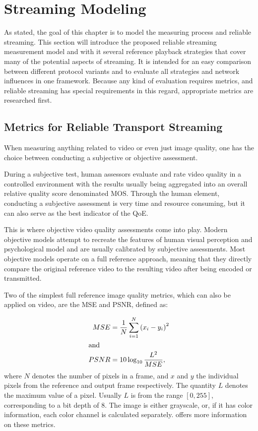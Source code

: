 \section{Streaming Modeling}
\label{c3:sec:modeling}

As stated, the goal of this chapter is to model the measuring process and reliable streaming. This section will introduce the proposed reliable streaming measurement model and with it several reference playback strategies that cover many of the potential aspects of streaming. It is intended for an easy comparison between different protocol variants and to evaluate all strategies and network influences in one framework. Because any kind of evaluation requires metrics, and reliable streaming has special requirements in this regard, appropriate metrics are researched first.


\subsection{Metrics for Reliable Transport Streaming}
\label{c3:sec:metrics}

When measuring anything related to video or even just image quality, one has the choice between conducting a subjective or objective assessment. 

During a subjective test, human assessors evaluate and rate video quality in a controlled environment with the results usually being aggregated into an overall relative quality score denominated \gls{MOS}. Through the human element, conducting a subjective assessment is very time and resource consuming, but it can also serve as the best indicator of the \gls{QoE}.

This is where objective video quality assessments come into play. Modern objective models attempt to recreate the features of human visual perception and psychological model and are usually calibrated by subjective assessments. Most objective models operate on a full reference approach, meaning that they directly compare the original reference video to the resulting video after being encoded or transmitted.

Two of the simplest full reference image quality metrics, which can also be applied on video, are the \gls{MSE} and \gls{PSNR}, defined as:


\begin{align}
	MSE &= \frac{1}{N} \sum_{i=1}^{N}{(x_i - y_i)}^2\\
	\shortintertext{and}
	PSNR &= 10 \log_{10} \frac{L^2}{MSE},
\end{align}
%
where $N$ denotes the number of pixels in a frame, and $x$ and $y$ the individual pixels from the reference and output frame respectively. The quantity $L$ denotes the maximum value of a pixel. Usually $L$ is from the range $[0,255]$, corresponding to a bit depth of \SI{8}{\bit}. The image is either grayscale, or, if it has color information, each color channel is calculated separately. \cite{objective-vqa} offers more information on these metrics.

